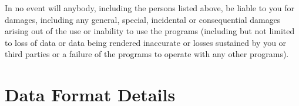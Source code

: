 \documentclass{report}
\begin{document}
In no event will anybody, including the persons listed above, be
liable to you for damages, including any general, special, incidental
or consequential damages arising out of the use or inability to use
the programs (including but not limited to loss of data or data being
rendered inaccurate or losses sustained by you or third parties or a
failure of the programs to operate with any other programs).

\newpage

\tableofcontents
\newpage
\pagestyle{headings}
\setcounter{page}{1}










\clearpage

\clearpage


\clearpage






\chapter{Data Format Details} \label{chap:storage}

















\printindex
\end{document}
